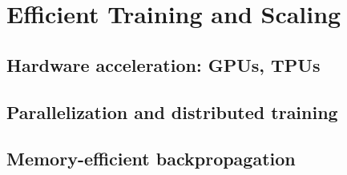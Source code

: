 ﻿\chapter{Efficient Training and Scaling}
\section{Hardware acceleration: GPUs, TPUs}

\section{Parallelization and distributed training}

\section{Memory-efficient backpropagation}


